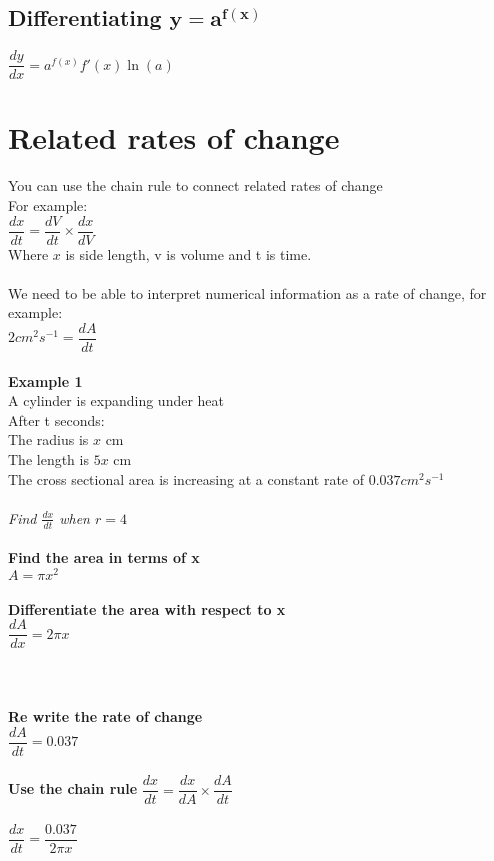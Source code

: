 \documentclass{article}[18pt]
\begin{document}
\subsection{Differentiating $\mathbf{y=a^{f(x)}}$}
$\dfrac{dy}{dx}=a^{f(x)}f'(x)\ln(a)$\\
\section{Related rates of change}
You can use the chain rule to connect related rates of change\\
For example:\\
$\dfrac{dx}{dt}=\dfrac{dV}{dt}\times\dfrac{dx}{dV}$\\
Where $x$ is side length, v is volume and t is time.\\
\\
We need to be able to interpret numerical information as a rate of change, for example:\\
$2cm^2s^{-1}=\dfrac{dA}{dt}$\\
\\
\textbf{Example 1}\\
A cylinder is expanding under heat\\
After t seconds:\\
The radius is $x$ cm\\
The length is $5x$ cm\\
The cross sectional area is increasing at a constant rate of $0.037cm^2s^{-1}$\\
\\
\textit{Find $\frac{dx}{dt}$ when $r=4$}\\
\\
\textbf{Find the area in terms of x}\\
$A=\pi x^2$\\
\\
\textbf{Differentiate the area with respect to x}\\
$\dfrac{dA}{dx}=2\pi x$\\
\\
\\
\\
\textbf{Re write the rate of change}\\
$\dfrac{dA}{dt}=0.037$\\
\\
\textbf{Use the chain rule}
$\dfrac{dx}{dt}=\dfrac{dx}{dA}\times\dfrac{dA}{dt}$\\
\\
$\dfrac{dx}{dt}=\dfrac{0.037}{2\pi x}$\\
\end{document}

